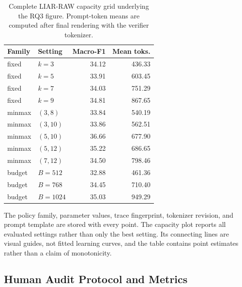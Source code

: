 \begin{table}[t]
\centering
\scriptsize
\setlength{\tabcolsep}{3pt}
\begin{tabular}{llrr}
\toprule
\textbf{Family} & \textbf{Setting} & \textbf{Macro-F1}
& \textbf{Mean toks.} \\
\midrule
fixed & \(k=3\) & 34.12 & 436.33 \\
fixed & \(k=5\) & 33.91 & 603.45 \\
fixed & \(k=7\) & 34.03 & 751.29 \\
fixed & \(k=9\) & 34.81 & 867.65 \\
\midrule
minmax & \((3,8)\)  & 33.84 & 540.19 \\
minmax & \((3,10)\) & 33.86 & 562.51 \\
minmax & \((5,10)\) & 36.66 & 677.90 \\
minmax & \((5,12)\) & 35.22 & 686.65 \\
minmax & \((7,12)\) & 34.50 & 798.46 \\
\midrule
budget & \(B=512\)  & 32.88 & 461.36 \\
budget & \(B=768\)  & 34.45 & 710.40 \\
budget & \(B=1024\) & 35.03 & 949.29 \\
\bottomrule
\end{tabular}
\caption{Complete LIAR-RAW capacity grid underlying the RQ3 figure.
Prompt-token means are computed after final rendering with the verifier
tokenizer.}
\label{tab:supp-capacity-grid}
\end{table}

The policy family, parameter values, trace fingerprint, tokenizer revision,
and prompt template are stored with every point.  The capacity plot reports
all evaluated settings rather than only the best setting.  Its connecting
lines are visual guides, not fitted learning curves, and the table contains
point estimates rather than a claim of monotonicity.



\subsection{Human Audit Protocol and Metrics}
\label{sec:supp-human}

